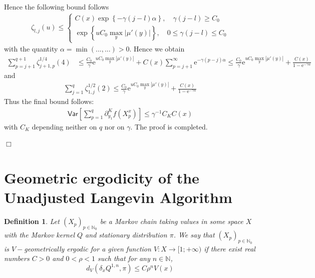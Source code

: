 \documentclass[bj]{imsart}
\def\nset{\mathbb{N}}
\def\rme{\mathrm{e}}
\newcommand{\proofendsign}{$\Box$}
\newtheorem{definition}{Definition}
\newenvironment{proof}{{\noindent \bf Proof }}
 {{\hspace*{\fill}\proofendsign\par\bigskip}}
\begin{document}
\begin{proof}
\[\]
Hence the following bound follows
\begin{align*}
\zeta_{l,j}(u) \leq \begin{cases} C(x)\exp\left\{-\gamma(j-l)\alpha\right\}, \quad \gamma(j-l) \geq C_0 \\
\exp\left\{uC_0\max\limits_{y}|\mu'(y)|\right\}, \quad 0 \leq \gamma(j-l) \leq C_0	
\end{cases}
\end{align*}
with the quantity $ \alpha = \min(...,...) > 0$. Hence we obtain
\begin{align*}
\sum_{p=j+1}^{q+1} \zeta^{1/4}_{j+1,p}(4) &\leq \frac{C_0}{\gamma}\rme^{uC_0\max\limits_{y}|\mu'(y)|} + C(x)\sum_{p=j+1}^{\infty} \rme^{-\gamma(p-j)\alpha}
\leq \frac{C_0}{\gamma}\rme^{uC_0\max\limits_{y}|\mu'(y)|} + \frac{C(x)}{1-\rme^{- \gamma\alpha}}
\end{align*}
and
\begin{align*}
\sum_{j=1}^{q} \zeta^{1/2}_{1,j}(2) \leq \frac{C_0}{\gamma}\rme^{uC_0\max\limits_{y}|\mu'(y)|} + \frac{C(x)}{1-\rme^{- \gamma\alpha}}
\end{align*}
Thus the final bound follows:
\begin{align*}
\mathsf{Var}\left[\sum_{p=1}^{q}\partial_{y_{1}}^{K}f\left(X^x_{p}\right)\right] \leq \gamma^{-1} C_K C(x)
\end{align*}
 with $C_K$  depending neither on $q$ nor on $\gamma$. The proof is completed.
\end{proof}


\appendix
\section{Geometric ergodicity of the Unadjusted Langevin Algorithm}\label{sec:appendix}


\begin{definition}
\label{def:v_ergodicity}
Let $(X_p)_{p \in \nset_0}$ be a Markov chain taking values in some space $X$ with the Markov kernel $Q$ and stationary distribution $\pi$. We say that $(X_p)_{p \in \nset_0}$ is $V-$geometrically ergodic for a given function $V: X \rightarrow [1; +\infty)$ if there exist real numbers $C > 0$ and $0 < \rho < 1$ such that for any $n \in \nset$,
\begin{equation}
\label{eq:v_ergodicity}
d_V(\delta_xQ^{1,n},\pi) \leq C\rho^n V(x)
\end{equation}
\end{definition}
\end{document}
